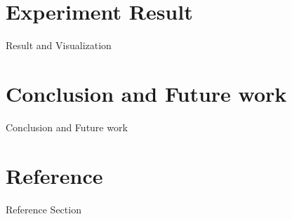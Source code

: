 \documentclass[12pt]{article}
\begin{document}
\section{Experiment Result}
Result and Visualization\\


\section{Conclusion and Future work}
Conclusion and Future work\\


\section*{Reference}
Reference Section\\




\end{document}
